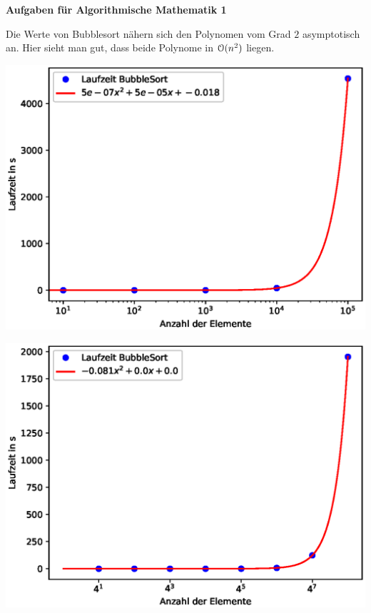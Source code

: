 \documentclass[a4paper,oneside,11pt]{scrartcl}
\begin{document}

\begin{center}
{\Large{\textbf{Aufgaben für Algorithmische Mathematik 1}}} \\
\end{center}
Die Werte von Bubblesort nähern sich den Polynomen vom Grad $2$ asymptotisch an. Hier sieht man gut, dass beide Polynome in $\mathcal{O}(n^2)$ liegen.\\
\begin{minipage}[t][4cm][t]{0.49 \textwidth}
\centering
\includegraphics[scale=0.55]{./graphs/laufzeit.eps}
\end{minipage}
\pagebreak
\begin{minipage}[t][4cm][t]{0.49 \textwidth}
\centering
\includegraphics[scale=0.55]{./graphs/laufzeit4.eps}
\end{minipage} \\
\end{document}
